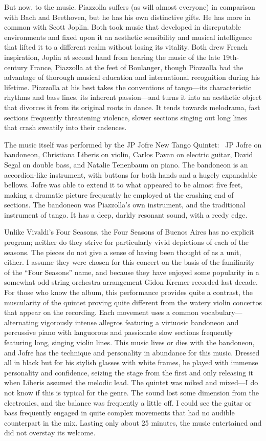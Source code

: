 But now, to the music. Piazzolla suffers (as will almost everyone) in comparison with Bach and Beethoven, but he has his own distinctive gifts. He has more in common with Scott Joplin. Both took music that developed in disreputable environments and fixed upon it an aesthetic sensibility and musical intelligence that lifted it to a different realm without losing its vitality. Both drew French inspiration, Joplin at second hand from hearing the music of the late 19th-century France, Piazzolla at the feet of Boulanger, though Piazzolla had the advantage of thorough musical education and international recognition during his lifetime. Piazzolla at his best takes the conventions of tango—its characteristic rhythms and bass lines, its inherent passion—and turns it into an aesthetic object that divorces it from its original roots in dance. It tends towards melodrama, fast sections frequently threatening violence, slower sections singing out long lines that crash sweatily into their cadences.

The music itself was performed by the JP Jofre New Tango Quintet:  JP Jofre on bandoneon, Christiana Liberis on violin, Carlos Pavan on electric guitar, David Segal on double bass, and Natalie Tenenbaum on piano. The bandoneon is an accordion-like instrument, with buttons for both hands and a hugely expandable bellows. Jofre was able to extend it to what appeared to be almost five feet, making a dramatic picture frequently he employed at the crashing end of sections. The bandoneon was Piazzolla’s own instrument, and the traditional instrument of tango. It has a deep, darkly resonant sound, with a reedy edge.

Unlike Vivaldi’s Four Seasons, the Four Seasons of Buenos Aires has no explicit program; neither do they strive for particularly vivid depictions of each of the seasons. The pieces do not give a sense of having been thought of as a unit, either. I assume they were chosen for this concert on the basis of the familiarity of the “Four Seasons” name, and because they have enjoyed some popularity in a somewhat odd string orchestra arrangement Gidon Kremer recorded last decade. For those who know the album, this performance provides quite a contrast, the muscularity of the quintet proving quite different from the watery violin concertos that appear on the recording. Each movement uses a common vocabulary—alternating vigorously intense allegros featuring a virtuosic bandoneon and percussive piano with languorous and passionate slow sections frequently featuring long, singing violin lines. This music lives or dies with the bandoneon, and Jofre has the technique and personality in abundance for this music. Dressed all in black but for his stylish glasses with white frames, he played with immense personality and confidence, seizing the stage from the first and only releasing it when Liberis assumed the melodic lead. The quintet was miked and mixed—I do not know if this is typical for the genre. The sound lost some dimension from the electronics, and the balance was frequently a little off. I could see the guitar or bass frequently engaged in quite complex movements that had no audible counterpart in the mix. Lasting only about 25 minutes, the music entertained and did not overstay its welcome.
